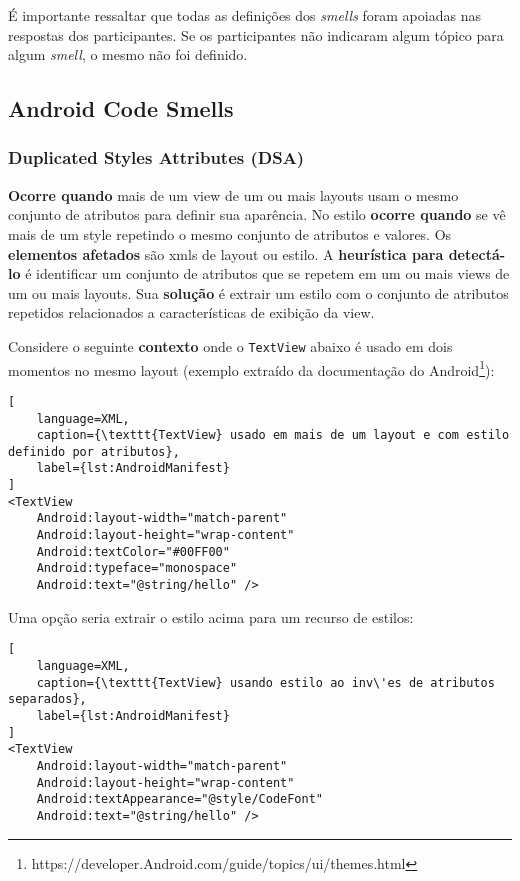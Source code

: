 \'E importante ressaltar que todas as defini\c{c}\~oes dos \textit{smells} foram apoiadas nas respostas dos participantes. Se os participantes n\~ao indicaram algum t\'opico para algum \textit{smell}, o mesmo n\~ao foi definido. \\


\subsection{Android Code Smells}
\label{sub:Android-code-smells}

\subsubsection{Duplicated Styles Attributes (DSA)}

\textbf{Ocorre quando} mais de um view de um ou mais layouts usam o mesmo conjunto de atributos para definir sua apar\^encia. No estilo \textbf{ocorre quando} se v\^e mais de um style repetindo o mesmo conjunto de atributos e valores. Os \textbf{elementos afetados} s\~ao xmls de layout ou estilo. A \textbf{heur\'istica para detect\'a-lo} \'e identificar um conjunto de atributos que se repetem em um ou mais views de um ou mais layouts. Sua \textbf{solu\c{c}\~ao} \'e extrair um estilo com o conjunto de atributos repetidos relacionados a caracter\'isticas de exibi\c{c}\~ao da view. 

Considere o seguinte \textbf{contexto} onde o \texttt{TextView} abaixo \'e usado em dois momentos no mesmo layout (exemplo extra\'ido da documenta\c{c}\~ao do Android\footnote{https://developer.Android.com/guide/topics/ui/themes.html}):

\begin{lstlisting}[
	language=XML, 
	caption={\texttt{TextView} usado em mais de um layout e com estilo definido por atributos}, 
	label={lst:AndroidManifest}
]
<TextView
    Android:layout-width="match-parent"
    Android:layout-height="wrap-content"
    Android:textColor="#00FF00"
    Android:typeface="monospace"
    Android:text="@string/hello" />
\end{lstlisting}

Uma op\c{c}\~ao seria extrair o estilo acima para um recurso de estilos:

\begin{lstlisting}[
	language=XML, 
	caption={\texttt{TextView} usando estilo ao inv\'es de atributos separados}, 
	label={lst:AndroidManifest}
]
<TextView
    Android:layout-width="match-parent"
    Android:layout-height="wrap-content"
    Android:textAppearance="@style/CodeFont"
    Android:text="@string/hello" />
\end{lstlisting}


